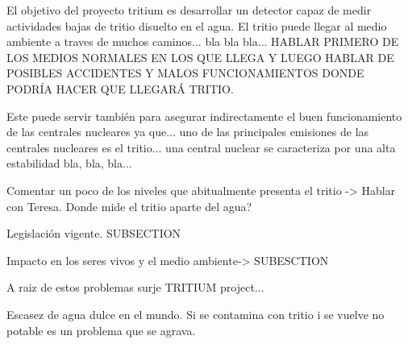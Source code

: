 El objetivo del proyecto tritium es desarrollar un detector capaz de medir actividades bajas de tritio disuelto en el agua. El tritio puede llegar al medio ambiente a traves de muchos caminos... bla bla bla... HABLAR PRIMERO DE LOS MEDIOS NORMALES EN LOS QUE LLEGA Y LUEGO HABLAR DE POSIBLES ACCIDENTES Y MALOS FUNCIONAMIENTOS DONDE PODRÍA HACER QUE LLEGARÁ TRITIO.

Este puede servir también para asegurar indirectamente el buen funcionamiento de las centrales nucleares ya que... uno de las principales emisiones de las centrales nucleares es el tritio... una central nuclear se caracteriza por una alta estabilidad bla, bla, bla... 

Comentar un poco de los niveles que abitualmente presenta el tritio -> Hablar con Teresa. Donde mide el tritio aparte del agua? 

Legislación vigente. SUBSECTION

Impacto en los seres vivos y el medio ambiente-> SUBESCTION

A raiz de estos problemas surje TRITIUM project...


Escasez de agua dulce en el mundo. Si se contamina con tritio i se vuelve no potable es un problema que se agrava.
